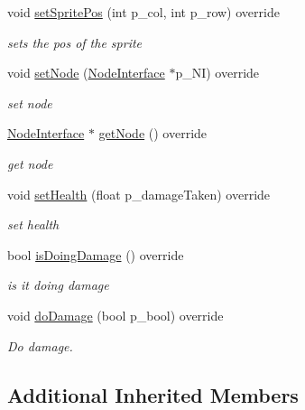 \begin{DoxyCompactItemize}
void \mbox{\hyperlink{class_static_sprite_add5e0038c152e9d7e65afd47ba36abce}{set\+Sprite\+Pos}} (int p\+\_\+col, int p\+\_\+row) override
\begin{DoxyCompactList}\small\item\em sets the pos of the sprite \end{DoxyCompactList}\item 
void \mbox{\hyperlink{class_static_sprite_a39f0883a2c8933804ab6bd172cdc02fd}{set\+Node}} (\mbox{\hyperlink{class_node_interface}{Node\+Interface}} $\ast$p\+\_\+\+NI) override
\begin{DoxyCompactList}\small\item\em set node \end{DoxyCompactList}\item 
\mbox{\hyperlink{class_node_interface}{Node\+Interface}} $\ast$ \mbox{\hyperlink{class_static_sprite_a672bb6e3425bbc15cd9034ab9e2802fd}{get\+Node}} () override
\begin{DoxyCompactList}\small\item\em get node \end{DoxyCompactList}\item 
\mbox{\label{class_static_sprite_a975babf5d18d76c800a72a416558d7a4}} 
void \mbox{\hyperlink{class_static_sprite_a975babf5d18d76c800a72a416558d7a4}{set\+Health}} (float p\+\_\+damage\+Taken) override
\begin{DoxyCompactList}\small\item\em set health \end{DoxyCompactList}\item 
bool \mbox{\hyperlink{class_static_sprite_a4b037abeff328dd42777875fd145aae3}{is\+Doing\+Damage}} () override
\begin{DoxyCompactList}\small\item\em is it doing damage \end{DoxyCompactList}\item 
\mbox{\label{class_static_sprite_a9b37e143ababf2b27a8372ab09f14f7b}} 
void \mbox{\hyperlink{class_static_sprite_a9b37e143ababf2b27a8372ab09f14f7b}{do\+Damage}} (bool p\+\_\+bool) override
\begin{DoxyCompactList}\small\item\em Do damage. \end{DoxyCompactList}\end{DoxyCompactItemize}
\subsection*{Additional Inherited Members}


